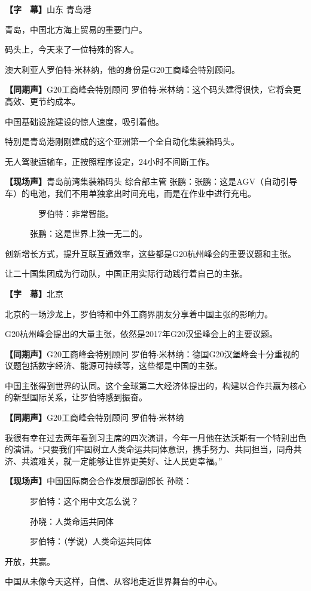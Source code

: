 \documentclass{ctexart}
\newcommand{\zkh}[1]{\textbf{\hspace{-2.7em} 【#1】}}
\begin{document}
\zkh{字　幕}山东 青岛港

青岛，中国北方海上贸易的重要门户。

码头上，今天来了一位特殊的客人。

澳大利亚人罗伯特\textbf{$\cdot $}米林纳，他的身份是G20工商峰会特别顾问。

\zkh{同期声}G20工商峰会特别顾问 罗伯特\textbf{$\cdot $}米林纳：这个码头建得很快，它将会更高效、更节约成本。

中国基础设施建设的惊人速度，吸引着他。

特别是青岛港刚刚建成的这个亚洲第一个全自动化集装箱码头。

无人驾驶运输车，正按照程序设定，24小时不间断工作。

\zkh{现场声}青岛前湾集装箱码头 综合部主管 张鹏：张鹏：这是AGV（自动引导车）的电池，我们不用单独拿出时间充电，而是在作业中进行充电。

　　　　罗伯特：非常智能。

　　　张鹏：这是世界上独一无二的。

创新增长方式，提升互联互通效率，这些都是G20杭州峰会的重要议题和主张。

让二十国集团成为行动队，中国正用实际行动践行着自己的主张。

\zkh{字　幕}北京

北京的一场沙龙上，罗伯特和中外工商界朋友分享着中国主张的影响力。

G20杭州峰会提出的大量主张，依然是2017年G20汉堡峰会上的主要议题。

\zkh{同期声}G20工商峰会特别顾问 罗伯特\textbf{$\cdot $}米林纳：德国G20汉堡峰会十分重视的议题包括数字经济、能源可持续等，这些都是中国的主张。

中国主张得到世界的认同。这个全球第二大经济体提出的，构建以合作共赢为核心的新型国际关系，让罗伯特感到振奋。

\zkh{同期声}G20工商峰会特别顾问 罗伯特\textbf{$\cdot $}米林纳

我很有幸在过去两年看到习主席的四次演讲，今年一月他在达沃斯有一个特别出色的演讲。``只要我们牢固树立人类命运共同体意识，携手努力、共同担当，同舟共济、共渡难关，就一定能够让世界更美好、让人民更幸福。''

\zkh{现场声}中国国际商会合作发展部副部长 孙晓：

　　　罗伯特：这个用中文怎么说？

　　　孙晓：人类命运共同体

　　　罗伯特：（学说）人类命运共同体

开放，共赢。

中国从未像今天这样，自信、从容地走近世界舞台的中心。
\end{document}
